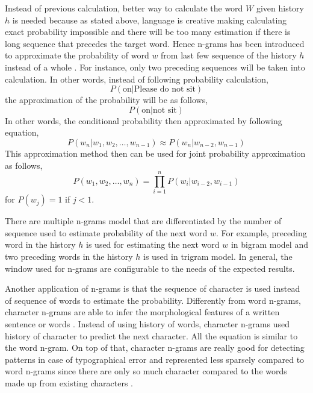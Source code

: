     Instead of previous calculation, better way to calculate the word
    $W$ given history $h$ is needed because as stated above, language
    is creative making calculating exact probability impossible and
    there will be too many estimation if there is long sequence that
    precedes the target word. Hence n-grams has been introduced to
    approximate the probability of word $w$ from last few sequence of
    the history $h$ instead of a whole
    \citep{speech2009Jurafsky:2009:SLP:1214993}. For instance, only
    two preceding sequences will be taken into calculation.
    In other words, instead of following probability calculation,
    \begin{equation}
        P(\text{on} \vert \text{Please do not sit})
    \end{equation}
    the approximation of the probability will be as follows,
    \begin{equation}
        P(\text{on} \vert \text{not sit})
    \end{equation}
    In other words, the conditional probability then approximated by
    following equation,
    \begin{equation}
        \label{eq:condprobapprox}
        P(w_n \vert w_1, w_2, \dots, w_{n-1}) \approx P(w_n \vert w_{n-2}, w_{n-1})
    \end{equation}
    This approximation method then can be used for joint probability
    approximation as follows,
    \begin{equation}
        P(w_1, w_2, \dots, w_n) = \prod_{i=1}^n P(w_i \vert w_{i-2}, w_{i-1})
    \end{equation}
    for $P(w_j) = 1$ if $j < 1$.

    There are multiple n-grams model that are differentiated by the number
    of sequence used to estimate probability of the next word $w$. For
    example, preceding word in the history $h$ is used for estimating
    the next word $w$ in bigram model and two preceding words in the
    history $h$ is used in trigram model. In general, the window used
    for n-grams are configurable to the needs of the expected results.
    
    Another application of n-grams is that the sequence of character
    is used instead of sequence of words to estimate the probability.
    Differently from word n-grams, character n-grams are able to infer
    the morphological features of a written sentence or words
    \citep{kulmizev-etal-2017-power}. Instead of using history of
    words, character n-grams used history of character to predict the
    next character. All the equation is similar to the word n-gram. On
    top of that, character n-grams are really good for detecting
    patterns in case of typographical error and represented less
    sparsely compared to word n-grams since there are only so much
    character compared to the words made up from existing characters
    \citep{kulmizev-etal-2017-power}.